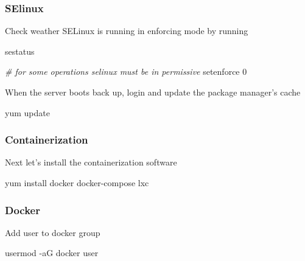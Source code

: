 \documentclass[
  14pt,
  english,
  a4paper,
]{scrreprt}
\newenvironment{Shaded}{}{}
\newcommand{\CommentTok}[1]{\textcolor[rgb]{0.38,0.63,0.69}{\textit{#1}}}
\newcommand{\ExtensionTok}[1]{#1}
\newcommand{\NormalTok}[1]{#1}
\begin{document}
\hypertarget{selinux-1}{%
\subsubsection{SElinux}\label{selinux-1}}

Check weather SELinux is running in enforcing mode by running

\begin{Shaded}
\begin{Highlighting}[]
\ExtensionTok{sestatus}

\CommentTok{\# for some operations selinux must be in permissive}
\ExtensionTok{setenforce}\NormalTok{ 0}
\end{Highlighting}
\end{Shaded}

When the server boots back up, login and update the package manager's
cache

\begin{Shaded}
\begin{Highlighting}[]
\ExtensionTok{yum}\NormalTok{ update}
\end{Highlighting}
\end{Shaded}

\hypertarget{containerization-1}{%
\subsubsection{Containerization}\label{containerization-1}}

Next let's install the containerization software

\begin{Shaded}
\begin{Highlighting}[]
\ExtensionTok{yum}\NormalTok{ install docker docker{-}compose lxc}
\end{Highlighting}
\end{Shaded}

\hypertarget{docker-1}{%
\subsubsection{Docker}\label{docker-1}}

Add user to docker group

\begin{Shaded}
\begin{Highlighting}[]
\ExtensionTok{usermod}\NormalTok{ {-}aG docker user}
\end{Highlighting}
\end{Shaded}
\end{document}
